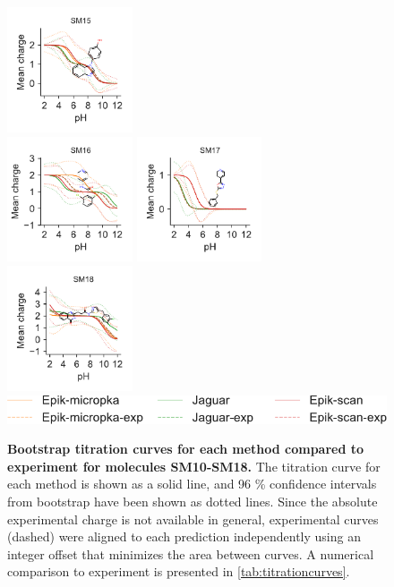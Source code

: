 \documentclass[9pt,lineno,final]{elife}
\begin{document}
\begin{figure}[H]
	\includegraphics[width=0.33\textwidth]{Reports/SM15-titrationcurve-views.pdf}	 \\
	\includegraphics[width=0.33\textwidth]{Reports/SM16-titrationcurve-views.pdf}
	\includegraphics[width=0.33\textwidth]{Reports/SM17-titrationcurve-views.pdf}
	\includegraphics[width=0.33\textwidth]{Reports/SM18-titrationcurve-views.pdf}	 \\
	\includegraphics[]{Reports/overview-legend.pdf}

	\caption{{\bf Bootstrap titration curves for each method compared to experiment for molecules SM10-SM18.} The titration curve for each method is shown as a solid line, and 96 \% confidence intervals from bootstrap have been shown as dotted lines. Since the absolute experimental charge is not available in general, experimental curves (dashed) were aligned to each prediction independently using an integer offset that minimizes the area between curves. A numerical comparison to experiment is presented in \cref{tab:titrationcurves}.
	\label{fig:charge-curves2}}

\end{figure}
    
\end{document}

